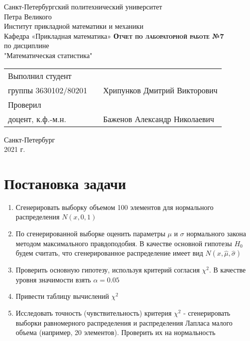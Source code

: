 \documentclass[12pt,a4paper]{article}
\begin{document}
    \begin{titlepage}
        \begin{center}
            \large
            Санкт-Петербургский политехнический университет\\Петра Великого\\
            \vspace{0.5cm}
            Институт прикладной математики и механики\\
            \vspace{0.25cm}
            Кафедра «Прикладная математика»
            \vfill
            \textsc{\LARGE\textbf{Отчет по лабораторной работе №7}}\\[5mm]
            \Large
            по дисциплине\\"Математическая статистика"
        \end{center}
        \vfill
        \begin{tabular}{l p{175pt} l}
            Выполнил студент \\ группы 3630102/80201 && Хрипунков Дмитрий Викторович
            \vspace{0.25cm}
            \\Проверил \\ доцент, к.ф.-м.н. && Баженов Александр Николаевич
        \end{tabular}
        \vfill
        \begin{center}
            Санкт-Петербург \\ 2021 г.
        \end{center}
    \end{titlepage}
    
\newpage
\begin{center}
    \tableofcontents
    \setcounter{page}{2}
\end{center}
\newpage
\begin{center}
    \listoftables
\end{center}

\newpage
\section{Постановка задачи}
\begin{enumerate}
    \item Сгенерировать выборку объемом 100 элементов для нормального распределения $N(x,0,1)$
    \item По сгенерированной выборке оценить параметры $\mu$ и $\sigma$ нормального закона методом максимального правдоподобия. В качестве основной гипотезы $H_0$ будем считать, что сгенерированное распределение имеет вид $N(x,\hat\mu,\hat\sigma)$
    \item Проверить основную гипотезу, используя критерий согласия $\chi^2$. В качестве уровня значимости взять $\alpha=0.05$
    \item Привести таблицу вычислений $\chi^2$
    \item Исследовать точность (чувствительность) критерия $\chi^2$ - сгенерировать выборки равномерного распределения и распределения Лапласа малого объема (например, 20 элементов). Проверить их на нормальность
\end{enumerate}
\end{document}

